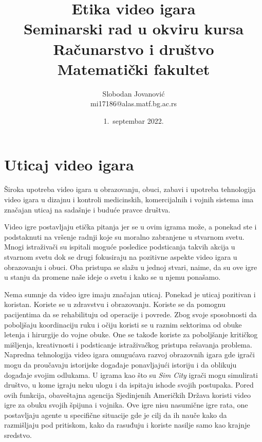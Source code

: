 \documentclass[a4paper]{article}
\begin{document}
\title{Etika video igara\\ \small{Seminarski rad u okviru kursa\\Računarstvo i društvo\\ Matematički fakultet}}

\author{Slobodan Jovanović\\ mi17186@alas.matf.bg.ac.rs}
\date{1.~septembar 2022.}
\maketitle

\tableofcontents

\newpage

\section{Uticaj video igara}
\label{sec:uvod}
Široka upotreba video igara u obrazovanju, obuci, zabavi i upotreba tehnologija
video igara u dizajnu i kontroli medicinskih, komercijalnih i vojnih sistema ima
značajan uticaj na sadašnje i buduće pravce društva.

Video igre postavljaju etička pitanja jer se u ovim igrama može, a ponekad ste i
podstaknuti na vršenje radnji koje su moralno zabranjene u stvarnom svetu. Mnogi
istraživači su ispitali moguće posledice podsticanja takvih akcija u stvarnom svetu
dok se drugi fokusiraju na pozitivne aspekte video igara u obrazovanju i obuci. Oba
pristupa se slažu u jednoj stvari, naime, da su ove igre u stanju da promene naše ideje o
svetu i kako se u njemu ponašamo.

Nema sumnje da video igre imaju značajan uticaj. Ponekad je uticaj pozitivan i koristan.
Koriste se u zdravstvu i obrazovanju. Koriste se da pomognu pacijentima da se rehabilituju od
operacije i povrede. Zbog svoje sposobnosti da poboljšaju koordinaciju ruku i očiju
koristi se u raznim sektorima od obuke letenja i hirurgije do vojne obuke. One se takođe
koriste za poboljšanje kritičkog mišljenja, kreativnosti i podsticanje istraživačkog pristupa
rešavanja problema. Napredna tehnologija video igara omugućava razvoj obrazovnih igara gde
igrači mogu da proučavaju istorijske događaje ponavljajući istoriju i da
oblikuju događaje svojim odlukama. U igrama kao što su {\em Sim City} igrači mogu simulirati društvo, u kome igraju neku
ulogu i da ispitaju ishode svojih postupaka. Pored ovih funkcija, obaveštajna agencija Sjedinjenih Američkih Država
koristi video igre za obuku svojih špijuna i vojnika. Ove igre nisu nasumične igre rata, 
one postavljaju agente u specifične situacije gde je cilj da ih nauče kako da
razmišljaju pod pritiskom, kako da rasuđuju i koriste nasilje samo kao krajnje sredstvo.
\newpage
\end{document}
